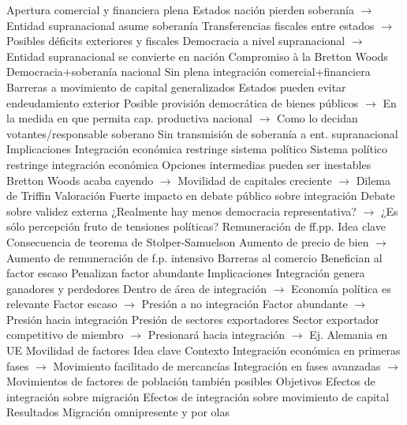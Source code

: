 \documentclass{nuevotema}
\begin{document}
\begin{esquemal}
				\4[] Apertura comercial y financiera plena
				\4[] Estados nación pierden soberanía
				\4[] $\to$ Entidad supranacional asume soberanía
				\4[] Transferencias fiscales entre estados
				\4[] $\to$ Posibles déficits exteriores y fiscales
				\4[] Democracia a nivel supranacional
				\4[] $\to$ Entidad supranacional se convierte en nación
				\4[C] Compromiso à la Bretton Woods
				\4[] Democracia+soberanía nacional
				\4[] Sin plena integración comercial+financiera
				\4[] Barreras a movimiento de capital generalizados
				\4[] Estados pueden evitar endeudamiento exterior
				\4[] Posible provisión democrática de bienes públicos
				\4[] $\to$ En la medida en que permita cap. productiva nacional
				\4[] $\to$ Como lo decidan votantes/responsable soberano
				\4[] Sin transmisión de soberanía a ent. supranacional
			\3 Implicaciones
				\4 Integración económica restringe sistema político
				\4 Sistema político restringe integración económica
				\4 Opciones intermedias pueden ser inestables
				\4[] Bretton Woods acaba cayendo
				\4[] $\to$ Movilidad de capitales creciente
				\4[] $\to$ Dilema de Triffin
			\3 Valoración
				\4 Fuerte impacto en debate público sobre integración
				\4 Debate sobre validez externa
				\4[] ¿Realmente hay menos democracia representativa?
				\4[] $\to$ ¿Es sólo percepción fruto de tensiones políticas?
	\1 
		\2 Remuneración de ff.pp.
			\3 Idea clave
				\4 Consecuencia de teorema de Stolper-Samuelson
				\4[] Aumento de precio de bien
				\4[] $\to$ Aumento de remuneración de f.p. intensivo
				\4 Barreras al comercio
				\4[] Benefician al factor escaso
				\4[] Penalizan factor abundante
			\3 Implicaciones
				\4 Integración genera ganadores y perdedores
				\4[] Dentro de área de integración
				\4[] $\to$ Economía política es relevante
				\4[] Factor escaso
				\4[] $\to$ Presión a no integración
				\4[] Factor abundante
				\4[] $\to$ Presión hacia integración
				\4 Presión de sectores exportadores
				\4[] Sector exportador competitivo de miembro
				\4[] $\to$ Presionará hacia integración
				\4[] $\to$ Ej. Alemania en UE
		\2 Movilidad de factores
			\3 Idea clave
				\4 Contexto
				\4[] Integración económica en primeras fases
				\4[] $\to$ Movimiento facilitado de mercancías
				\4[] Integración en fases avanzadas
				\4[] $\to$ Movimientos de factores de población también posibles
				\4 Objetivos
				\4[] Efectos de integración sobre migración
				\4[] Efectos de integración sobre movimiento de capital
				\4 Resultados
				\4[] Migración omnipresente y por olas

\end{esquemal}
\end{document}
